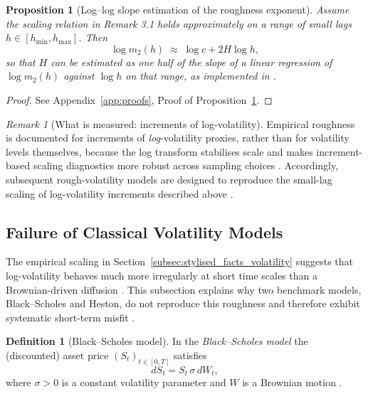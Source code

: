 \documentclass[12pt,a4paper]{article}
\theoremstyle{definition}
\newtheorem{definition}{Definition}[section]
\theoremstyle{plain}
\newtheorem{proposition}{Proposition}[section]
\theoremstyle{remark}
\newtheorem{remark}{Remark}[section]
\theoremstyle{plain}
\begin{document}
\begin{proposition}[Log--log slope estimation of the roughness exponent]
\label{prop:loglog_estimation}
Assume the scaling relation in Remark 3.1 holds approximately on a range of small lags $h\in[h_{\min},h_{\max}]$.
Then
\[
\log m_2(h)\;\approx\;\log c + 2H\log h,
\]
so that $H$ can be estimated as one half of the slope of a linear regression of $\log m_2(h)$ against $\log h$ on that range, as implemented in \cite{GatheralRough}.
\end{proposition}

\begin{proof}
See Appendix~\ref{app:proofs}, Proof of Proposition~\ref{prop:loglog_estimation}.
\end{proof}

\begin{remark}[What is measured: increments of log-volatility]
\label{rem:why_log_vol}
Empirical roughness is documented for increments of \emph{log}-volatility proxies, rather than for volatility levels themselves, because the log transform stabilises scale and makes increment-based scaling diagnostics more robust across sampling choices \cite{GatheralRough}.
Accordingly, subsequent rough-volatility models are designed to reproduce the small-lag scaling of log-volatility increments described above \cite{GatheralRough}.
\end{remark}

\subsection{Failure of Classical Volatility Models}
\label{subsec:failure_classical_models}

The empirical scaling in Section~\ref{subsec:stylised_facts_volatility} suggests that log-volatility behaves much more irregularly at short time scales than a Brownian-driven diffusion \cite{GatheralRough}. 
This subsection explains why two benchmark models, Black--Scholes and Heston, do not reproduce this roughness and therefore exhibit systematic short-term misfit \cite{GatheralRough,BayerFriz2016}.

\begin{definition}[Black--Scholes model]
\label{def:black_scholes_model}
In the \emph{Black--Scholes model} the (discounted) asset price $(S_t)_{t\in[0,T]}$ satisfies
\[
dS_t = S_t\,\sigma\, dW_t,
\]
where $\sigma>0$ is a constant volatility parameter and $W$ is a Brownian motion \cite{BlackScholes1973}.
\end{definition}
\end{document}
